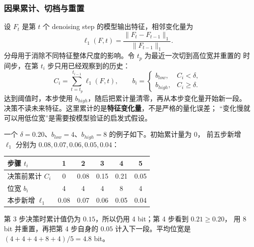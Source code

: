 \subsubsection{因果累计、切档与重置}

设 $F_t$ 是第 $t$ 个 denoising step 的模型输出特征，相邻变化量为
\begin{equation}
  \ell_1(F,t)=\frac{\|F_t-F_{t-1}\|_1}{\|F_{t-1}\|_1}.
  \label{eq:38-dvd-gbs-l1}
\end{equation}
分母用于消除不同特征整体尺度的影响。令 $t_p$ 为最近一次切到高位宽并重置的
时间步，在第 $t_i$ 步只用已经观察到的历史：
\begin{equation}
  C_i=\sum_{t=t_p}^{t_{i-1}}\ell_1(F,t),\qquad
  b_i=\begin{cases}
    b_{low}, & C_i<\delta,\\
    b_{high}, & C_i\ge\delta.
  \end{cases}
  \label{eq:38-dvd-gbs-rule}
\end{equation}
达到阈值时，本步使用 $b_{high}$，随后把累计量清零，再从本步变化量开始新一段。
决策不读未来特征。这里累计的是\textbf{特征变化量}，不是严格的量化误差；
“变化慢就可以用低位宽”是需要按模型验证的启发式假设。

一个 $\delta=0.20$、$b_{low}=4$、$b_{high}=8$ 的例子如下。初始累计量为 0，
前五步新增 $\ell_1$ 分别为 $0.08,0.07,0.06,0.05,0.04$：
\begin{center}\small
\begin{tabular}{@{}lccccc@{}}
\toprule
步骤 $t_i$ & 1 & 2 & 3 & 4 & 5 \\
\midrule
决策前累计 $C_i$ & 0 & 0.08 & 0.15 & 0.21 & 0.05 \\
位宽 $b_i$ & 4 & 4 & 4 & 8 & 4 \\
本步新增 $\ell_1$ & 0.08 & 0.07 & 0.06 & 0.05 & 0.04 \\
\bottomrule
\end{tabular}
\end{center}
第 3 步决策时累计值仍为 $0.15$，所以仍用 4 bit；第 4 步看到 $0.21\ge0.20$，
用 8 bit 并重置，再把第 4 步自身的 $0.05$ 计入下一段。平均位宽是
$(4+4+4+8+4)/5=4.8$ bit。

